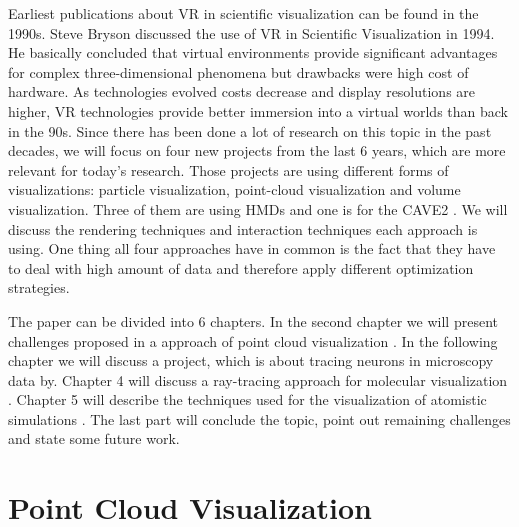 \documentclass[10pt,twocolumn,letterpaper]{article}
\begin{document}
\setlength{\parindent}{1pc}Earliest publications about VR in scientific visualization can be found in the 1990s. Steve Bryson \cite{bryson1994virtual} discussed the use of VR in Scientific Visualization in 1994. He basically concluded that virtual environments provide significant advantages for complex three-dimensional phenomena but drawbacks were high cost of hardware. As technologies evolved costs decrease and display resolutions are higher, VR technologies provide better immersion into a virtual worlds than back in the 90s. Since there has been done a lot of research on this topic in the past decades, we will focus on four new projects from the last 6 years, which are more relevant for today's research. Those projects are using different forms of visualizations: particle visualization, point-cloud visualization and volume visualization. Three of them are using HMDs and one is for the CAVE2 \cite{febretti2013cave2}. We will discuss the rendering techniques and interaction techniques each approach is using. One thing all four approaches have in common is the fact that they have to deal with high amount of data and therefore apply different optimization strategies.

\setlength{\parindent}{1pc}The paper can be divided into 6 chapters. In the second chapter we will present challenges proposed in a approach of point cloud visualization \cite{discher_point-based_2018}. In the following chapter we will discuss a project, which is about tracing neurons in microscopy data \cite{} by. Chapter 4 will discuss a ray-tracing approach for molecular visualization \cite{}. Chapter 5 will describe the techniques used for the visualization of atomistic simulations \cite{reda_visualizing_2013}. The last part will conclude the topic, point out remaining challenges and state some future work.

\section{Point Cloud Visualization}
\end{document}
